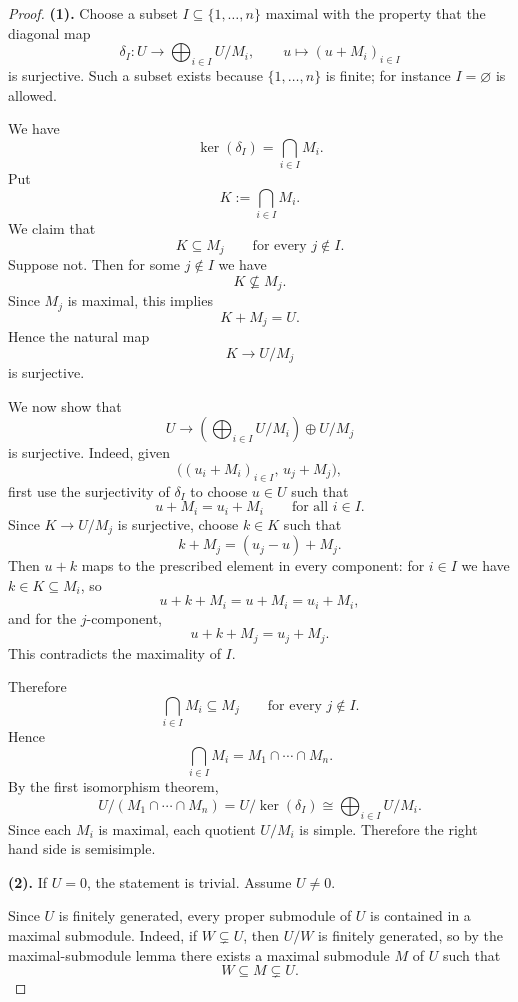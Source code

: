 \begin{proof}
    \textbf{(1).}
    Choose a subset $I\subseteq \{1,\dots,n\}$ maximal with the property that the
    diagonal map
    \[
        \delta_I:U\longrightarrow \bigoplus_{i\in I} U/M_i,\qquad
        u\longmapsto (u+M_i)_{i\in I}
    \]
    is surjective. Such a subset exists because $\{1,\dots,n\}$ is finite; for instance
    $I=\varnothing$ is allowed.

    We have
    \[
        \ker(\delta_I)=\bigcap_{i\in I}M_i.
    \]
    Put
    \[
        K:=\bigcap_{i\in I}M_i.
    \]
    We claim that
    \[
        K\subseteq M_j
        \qquad\text{for every }j\notin I.
    \]
    Suppose not. Then for some $j\notin I$ we have
    \[
        K\nsubseteq M_j.
    \]
    Since $M_j$ is maximal, this implies
    \[
        K+M_j=U.
    \]
    Hence the natural map
    \[
        K\longrightarrow U/M_j
    \]
    is surjective.

    We now show that
    \[
        U\longrightarrow
        \left(\bigoplus_{i\in I}U/M_i\right)\oplus U/M_j
    \]
    is surjective. Indeed, given
    \[
        \bigl((u_i+M_i)_{i\in I},\, u_j+M_j\bigr),
    \]
    first use the surjectivity of $\delta_I$ to choose $u\in U$ such that
    \[
        u+M_i=u_i+M_i
        \qquad\text{for all }i\in I.
    \]
    Since $K\to U/M_j$ is surjective, choose $k\in K$ such that
    \[
        k+M_j=(u_j-u)+M_j.
    \]
    Then $u+k$ maps to the prescribed element in every component:
    for $i\in I$ we have $k\in K\subseteq M_i$, so
    \[
        u+k+M_i=u+M_i=u_i+M_i,
    \]
    and for the $j$-component,
    \[
        u+k+M_j=u_j+M_j.
    \]
    This contradicts the maximality of $I$.

    Therefore
    \[
        \bigcap_{i\in I}M_i\subseteq M_j
        \qquad\text{for every }j\notin I.
    \]
    Hence
    \[
        \bigcap_{i\in I}M_i
        =
        M_1\cap\cdots\cap M_n.
    \]
    By the first isomorphism theorem,
    \[
        U/(M_1\cap\cdots\cap M_n)
        =
        U/\ker(\delta_I)
        \cong
        \bigoplus_{i\in I}U/M_i.
    \]
    Since each $M_i$ is maximal, each quotient $U/M_i$ is simple. Therefore the right
    hand side is semisimple.

    \textbf{(2).}
    If $U=0$, the statement is trivial. Assume $U\neq 0$.

    Since $U$ is finitely generated, every proper submodule of $U$ is contained in a
    maximal submodule. Indeed, if $W\subsetneq U$, then $U/W$ is finitely generated,
    so by the maximal-submodule lemma there exists a maximal submodule $M$ of $U$
    such that
    \[
        W\subseteq M\subsetneq U.
    \]


\end{proof}
